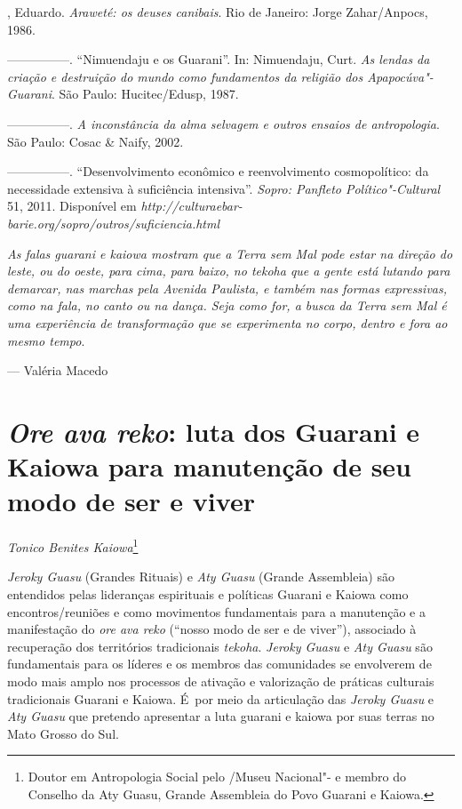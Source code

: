 \begin{Parskip}
, Eduardo. \emph{Araweté: os deuses canibais}. Rio de
Janeiro: Jorge Zahar/Anpocs, 1986.

—————. ``Nimuendaju e os Guarani''. In: Nimuendaju, Curt. \emph{As lendas
da criação e destruição do mundo como fundamentos da religião dos
Apapocúva"-Guarani}. São Paulo: Hucitec/Edusp, 1987.

—————. \emph{A inconstância da alma selvagem e outros ensaios de
antropologia}. São Paulo: Cosac \& Naify, 2002.

—————. ``Desenvolvimento econômico e reenvolvimento cosmopolítico:
da necessidade extensiva à suficiência intensiva''. \emph{Sopro: Panfleto
Político"-Cultural} 51, 2011. Disponível em
\emph{http://culturaebar-
barie.org/sopro/outros/suficiencia.html}
\end{Parskip}

\clearpage

\vspace*{\fill}

\begin{flushleft}
\begin{minipage}[c]{0.85\textwidth}
\raggedright
\footnotesize
\emph{As falas guarani e kaiowa mostram que a Terra sem Mal pode estar na
direção do leste, ou do oeste, para cima, para baixo, no \emph{tekoha} que a
gente está lutando para demarcar, nas marchas pela Avenida Paulista, e
também nas formas expressivas, como na fala, no canto ou na dança. Seja
como for, a busca da Terra sem Mal é uma experiência de transformação
que se experimenta no corpo, dentro e fora ao mesmo tempo}.

\smallskip
\hspace*{\fill}--- Valéria Macedo
\end{minipage}
\end{flushleft}

\chapter{\emph{Ore ava reko}: luta dos Guarani e Kaiowa para
manutenção de seu modo de ser e viver}

\begin{flushright}
\emph{Tonico Benites Kaiowa}\footnote{Doutor em Antropologia Social pelo
/Museu Nacional"- e membro do Conselho da Aty Guasu, Grande
Assembleia do Povo Guarani e Kaiowa.}
\end{flushright}
\bigskip

\noindent
\emph{Jeroky Guasu} (Grandes Rituais) e \emph{Aty Guasu} (Grande Assembleia) são
entendidos pelas lideranças espirituais e políticas Guarani e Kaiowa
como encontros/reuniões e como movimentos fundamentais para a
manutenção e a manifestação do \emph{ore ava reko} (``nosso modo de ser e de
viver''), associado à recuperação dos territórios tradicionais \emph{tekoha}.
\emph{Jeroky Guasu} e \emph{Aty Guasu} são fundamentais para os líderes e os membros
das comunidades se envolverem de modo mais amplo nos processos de
ativação e valorização de práticas culturais tradicionais Guarani e
Kaiowa. É~por meio da articulação das \emph{Jeroky Guasu} e \emph{Aty Guasu} que
pretendo apresentar a luta guarani e kaiowa por suas terras no Mato
Grosso do Sul. 

